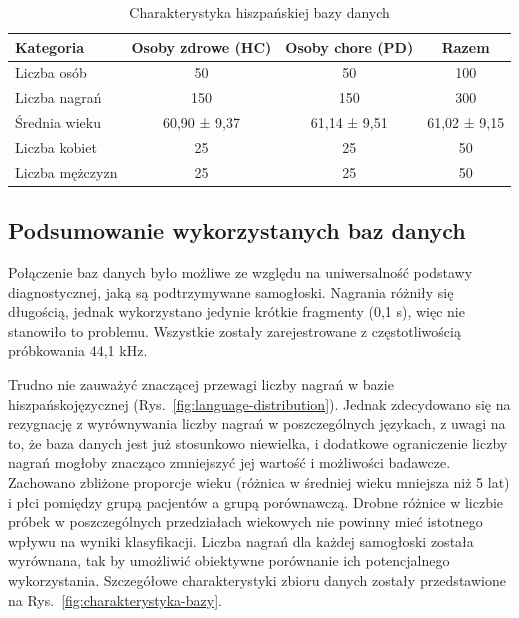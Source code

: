 \begin{table}[h]
\centering
\caption{Charakterystyka hiszpańskiej bazy danych}
\label{tab:spanish-database}
\begin{tabular}{|l|c|c|c|}
\hline
\textbf{Kategoria} &\textbf{Osoby zdrowe (HC)} &\textbf{Osoby chore (PD)} &\textbf{Razem} \\ \hline
Liczba osób &50 &50 &100\\ \hline
Liczba nagrań &150 &150 &300\\ \hline
Średnia wieku &60,90 ± 9,37 &61,14 ± 9,51  &61,02 ± 9,15\\ \hline
Liczba kobiet &25 &25 &50\\ \hline
Liczba mężczyzn &25 &25 &50 \\ \hline
\end{tabular}
\end{table}

\subsection{Podsumowanie wykorzystanych baz danych}
\label{subsec:podsumowanie-baz}

Połączenie baz danych było możliwe ze względu na uniwersalność podstawy diagnostycznej, jaką są podtrzymywane samogłoski.
Nagrania różniły się długością, jednak wykorzystano jedynie krótkie fragmenty (0,1 s), więc nie stanowiło to problemu.
Wszystkie zostały zarejestrowane z częstotliwością próbkowania 44,1 kHz.

Trudno nie zauważyć znaczącej przewagi liczby nagrań w bazie hiszpańskojęzycznej (Rys.~\ref{fig:language-distribution}).
Jednak zdecydowano się na rezygnację z wyrównywania liczby nagrań w poszczególnych językach, z uwagi na to, że baza danych jest już stosunkowo niewielka, i dodatkowe ograniczenie liczby nagrań mogłoby znacząco zmniejszyć jej wartość i możliwości badawcze.
Zachowano zbliżone proporcje wieku (różnica w średniej wieku mniejsza niż 5 lat) i płci pomiędzy grupą pacjentów a grupą porównawczą.
Drobne różnice w liczbie próbek w poszczególnych przedziałach wiekowych nie powinny mieć istotnego wpływu na wyniki klasyfikacji.
Liczba nagrań dla każdej samogłoski została wyrównana, tak by umożliwić obiektywne porównanie ich potencjalnego wykorzystania.
Szczegółowe charakterystyki zbioru danych zostały przedstawione na Rys.~\ref{fig:charakterystyka-bazy}.


